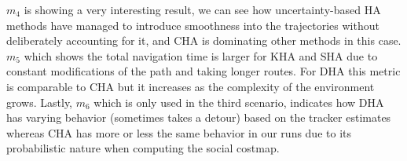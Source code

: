 $m_{4}$ is showing a very interesting result, we can see how uncertainty-based HA methods have managed to introduce smoothness into the trajectories without deliberately accounting for it, and CHA is dominating other methods in this case. $m_{5}$ which shows the total navigation time is larger for KHA and SHA due to constant modifications of the path and taking longer routes. For DHA this metric is comparable to CHA but it increases as the complexity of the environment grows. Lastly, $m_{6}$ which is only used in the third scenario, indicates how DHA has varying behavior (sometimes takes a detour) based on the tracker estimates whereas CHA has more or less the same behavior in our runs due to its probabilistic nature when computing the social costmap.     



